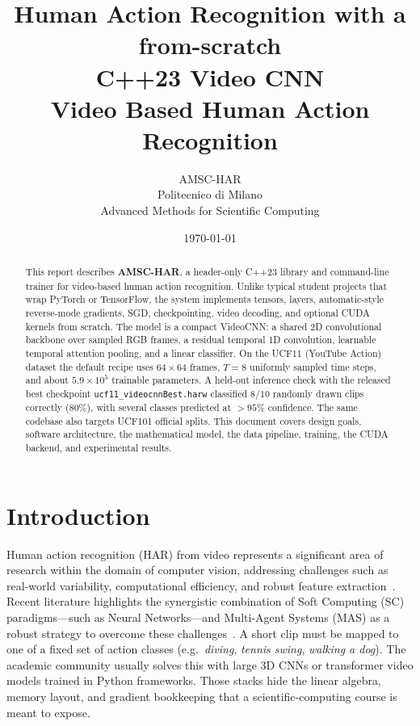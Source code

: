 \documentclass[11pt,a4paper]{article}
\title{\textbf{Human Action Recognition with a from-scratch\\
C++23 Video CNN}\\[0.4em]
\large Video Based Human Action Recognition}
\author{AMSC-HAR\\
Politecnico di Milano\\
Advanced Methods for Scientific Computing}
\date{\today}
\begin{document}
\maketitle
\vspace{-1.2em}

\begin{abstract}
This report describes \textbf{AMSC-HAR}, a header-only C++23 library and
command-line trainer for video-based human action recognition.
Unlike typical student projects that wrap PyTorch or TensorFlow, the system
implements tensors, layers, automatic-style reverse-mode gradients, SGD,
checkpointing, video decoding, and optional CUDA kernels from scratch.
The model is a compact VideoCNN: a shared 2D convolutional backbone over
sampled RGB frames, a residual temporal 1D convolution, learnable temporal
attention pooling, and a linear classifier.
On the UCF11 (YouTube Action) dataset the default recipe uses $64\times 64$
frames, $T=8$ uniformly sampled time steps, and about $5.9\times 10^5$
trainable parameters.
A held-out inference check with the released best checkpoint
\texttt{ucf11\_videocnnBest.harw} classified $8/10$ randomly drawn clips
correctly (80\%), with several classes predicted at $>95\%$ confidence.
The same codebase also targets UCF101 official splits.
This document covers design goals, software architecture, the mathematical
model, the data pipeline, training, the CUDA backend, and experimental
results.
\end{abstract}

\tableofcontents
\vspace{0.6em}

\section{Introduction}
\label{sec:intro}

Human action recognition (HAR) from video represents a significant area of research within the domain of computer vision, addressing challenges such as real-world variability, computational efficiency, and robust feature extraction~\cite{houssein2025integrating}. Recent literature highlights the synergistic combination of Soft Computing (SC) paradigms---such as Neural Networks---and Multi-Agent Systems (MAS) as a robust strategy to overcome these challenges~\cite{houssein2025integrating}. A short clip must be mapped to one of a fixed set of action classes (e.g.\ \emph{diving}, \emph{tennis swing}, \emph{walking a dog}). The academic community usually solves this with large 3D CNNs or transformer video models trained in Python frameworks.
Those stacks hide the linear algebra, memory layout, and gradient bookkeeping
that a scientific-computing course is meant to expose.
\end{document}
